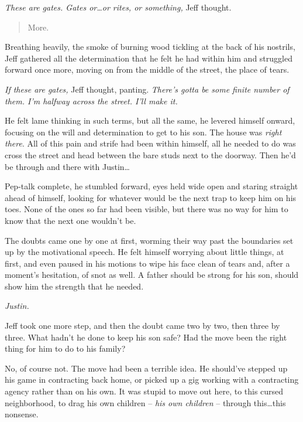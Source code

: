 \textit{These are gates.  Gates or\ldots{}or rites, or something,} Jeff thought.

\begin{quote}
  More.
\end{quote}

Breathing heavily, the smoke of burning wood tickling at the back of his nostrils, Jeff gathered all the determination that he felt he had within him and struggled forward once more, moving on from the middle of the street, the place of tears.

\secdiv

\textit{If these are gates,} Jeff thought, panting.  \textit{There's gotta be some finite number of them.  I'm halfway across the street.  I'll make it.}

He felt lame thinking in such terms, but all the same, he levered himself onward, focusing on the will and determination to get to his son.  The house was \textit{right there}.  All of this pain and strife had been within himself, all he needed to do was cross the street and head between the bare studs next to the doorway.  Then he'd be through and there with Justin\ldots{}

Pep-talk complete, he stumbled forward, eyes held wide open and staring straight ahead of himself, looking for whatever would be the next trap to keep him on his toes.  None of the ones so far had been visible, but there was no way for him to know that the next one wouldn't be.

The doubts came one by one at first, worming their way past the boundaries set up by the motivational speech.  He felt himself worrying about little things, at first, and even paused in his motions to wipe his face clean of tears and, after a moment's hesitation, of snot as well.  A father should be strong for his son, should show him the strength that he needed.

\textit{Justin.}

Jeff took one more step, and then the doubt came two by two, then three by three.  What hadn't he done to keep his son safe?  Had the move been the right thing for him to do to his family?

No, of course not.  The move had been a terrible idea.  He should've stepped up his game in contracting back home, or picked up a gig working with a contracting agency rather than on his own.  It was stupid to move out here, to this cursed neighborhood, to drag his own children -- \textit{his own children} -- through this\ldots{}this nonsense.

